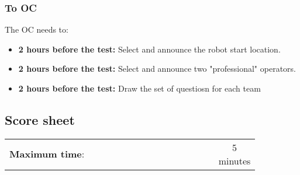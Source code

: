 \subsubsection*{To OC}
The OC needs to:
\begin{itemize}
	\item \textbf{2 hours before the test:} Select and announce the robot start location.
	\item \textbf{2 hours before the test:} Select and announce two "professional" operators.
	\item \textbf{2 hours before the test:} Draw the set of questiosn for each team
\end{itemize}

\newpage
\subsection*{Score sheet}

\begin{table}[h]
	\begin{tabular}{m{0.85\linewidth} c}
		\textbf{Maximum time}: & 5 minutes \\
	\end{tabular}
\end{table}

\begin{scorelist}




\end{scorelist}

\clearpage
